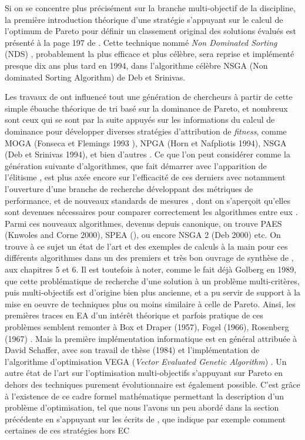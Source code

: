 Si on se concentre plus précisément sur la branche multi-objectif de la discipline, la première introduction théorique d'une stratégie s'appuyant sur le calcul de l'optimum de Pareto pour définir un classement original des solutions évalués est présenté à la page 197 de \textcite[197]{Goldberg1989}. Cette technique nommé \textit{Non Dominated Sorting} (NDS) \autocite[40-43]{Deb2001}, probablement la plus efficace et plus célèbre, sera reprise et implémenté presque dix ans plus tard en 1994, dans l'algorithme célèbre NSGA (Non dominated Sorting Algorithm) de Deb et Srinivas.

Les travaux de \textcite{Goldberg1989} ont influencé tout une génération de chercheurs à partir de cette simple ébauche théorique de tri basé sur la dominance de Pareto, et nombreux sont ceux qui se sont par la suite appuyés \autocite[175, 235]{Deb2001} sur les informations du calcul de dominance pour développer diverses stratégies d'attribution de \textit{fitness}, comme MOGA (Fonseca et Flemings 1993 \autocite{Fonseca1993}), NPGA (Horn et Nafpliotis 1994), NSGA (Deb et Srinivas 1994), et bien d'autres \autocite[14]{Zitzler1999a}. Ce que l'on peut considérer comme la génération suivante d'algorithmes, que \textcite{Coello2006}  fait démarrer avec l'apparition de l'élitisme , est plus axée encore sur l'efficacité de ces derniers avec notamment l'ouverture d'une branche de recherche développant des métriques de performance, et de nouveaux standards de mesures \autocites{Coello2006, Zitzler2003,Huband2006}, dont on s'aperçoit qu'elles sont devenues nécessaires pour comparer correctement les algorithmes entre eux \autocite[14-15]{Zitzler1999a}. Parmi ces nouveaux algorithmes, devenus depuis canonique, on trouve PAES (Knwoles and Corne 2000), SPEA (\autocite{Zitzler1999}), ou encore NSGA 2 (Deb 2000) etc. On trouve à ce sujet un état de l'art et des exemples de calculs à la main pour ces différents algorithmes dans un des premiers et très bon ouvrage de synthèse de \textcite{Deb2001}, aux chapitres 5 et 6. Il est toutefois à noter, comme le fait déjà Golberg en 1989, que cette problématique de recherche d'une solution à un problème multi-critères, puis multi-objectifs est d'origine bien plus ancienne, et a pu servir de support à la mise en oeuvre de techniques plus ou moins similaire à celle de Pareto. Ainsi, les premières traces en EA d'un intérêt théorique et parfois pratique de ces problèmes semblent remonter à Box et Draper (1957), Fogel (1966), Rosenberg (1967) \autocite[174-175]{Deb2001}. Mais la première implémentation informatique est en général attribuée à David Schaffer, avec son travail de thèse (1984) et l'implémentation de l'algorithme d'optimisation VEGA (\textit{Vector Evaluated Genetic Algorithm}) \autocite{Schaffer1985}. Un autre état de l'art sur l'optimisation multi-objectifs s'appuyant sur Pareto en dehors des techniques purement évolutionnaire est également possible. C'est grâce à l'existence de ce cadre formel mathématique permettant la description d'un problème d'optimisation, tel que nous l'avons un peu abordé dans la section précédente en s'appuyant sur les écrits de \autocite{Weise2011}, que \textcite[50-79]{Deb2001} indique par exemple comment certaines de ces stratégies hors EC 